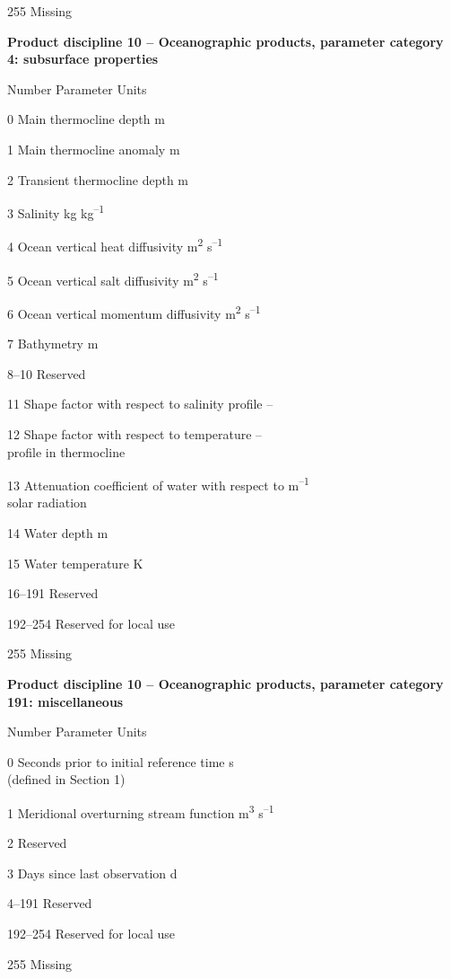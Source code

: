 255 Missing

\textbf{Product discipline 10 -- Oceanographic products, parameter category 4: subsurface properties}

Number Parameter Units

0 Main thermocline depth m

1 Main thermocline anomaly m

2 Transient thermocline depth m

3 Salinity kg kg\textsuperscript{--1}

4 Ocean vertical heat diffusivity m\textsuperscript{2} s\textsuperscript{--1}

5 Ocean vertical salt diffusivity m\textsuperscript{2} s\textsuperscript{--1}

6 Ocean vertical momentum diffusivity m\textsuperscript{2} s\textsuperscript{--1}

7 Bathymetry m

8--10 Reserved

11 Shape factor with respect to salinity profile --

12 Shape factor with respect to temperature --\\
profile in thermocline

13 Attenuation coefficient of water with respect to m\textsuperscript{--1}\\
solar radiation

14 Water depth m

15 Water temperature K

16--191 Reserved

192--254 Reserved for local use

255 Missing

\textbf{Product discipline 10 -- Oceanographic products, parameter category 191: miscellaneous}

Number Parameter Units

0 Seconds prior to initial reference time s\\
(defined in Section 1)

1 Meridional overturning stream function m\textsuperscript{3} s\textsuperscript{--1}

2 Reserved

3 Days since last observation d

4--191 Reserved

192--254 Reserved for local use

255 Missing

\emph{\textbf{\\
}}

